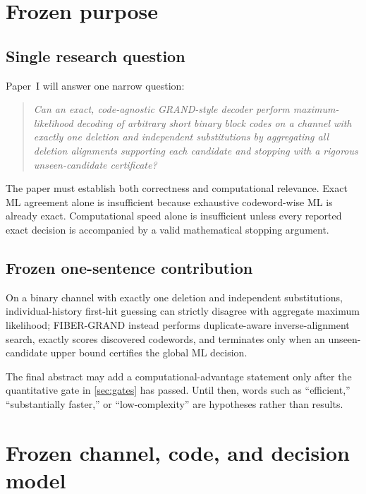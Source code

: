 \documentclass[11pt]{article}
\theoremstyle{definition}
\theoremstyle{remark}
\begin{document}
\tableofcontents
\clearpage

\section{Frozen purpose}
\label{sec:purpose}

\subsection{Single research question}

Paper~I will answer one narrow question:

\begin{quote}
\emph{Can an exact, code-agnostic GRAND-style decoder perform maximum-likelihood decoding of arbitrary short binary block codes on a channel with exactly one deletion and independent substitutions by aggregating all deletion alignments supporting each candidate and stopping with a rigorous unseen-candidate certificate?}
\end{quote}

The paper must establish both correctness and computational relevance. Exact ML agreement alone is insufficient because exhaustive codeword-wise ML is already exact. Computational speed alone is insufficient unless every reported exact decision is accompanied by a valid mathematical stopping argument.

\subsection{Frozen one-sentence contribution}
\label{sec:claim}

\begin{freezebox}
On a binary channel with exactly one deletion and independent substitutions, individual-history first-hit guessing can strictly disagree with aggregate maximum likelihood; FIBER-GRAND instead performs duplicate-aware inverse-alignment search, exactly scores discovered codewords, and terminates only when an unseen-candidate upper bound certifies the global ML decision.
\end{freezebox}

The final abstract may add a computational-advantage statement only after the quantitative gate in \cref{sec:gates} has passed. Until then, words such as ``efficient,'' ``substantially faster,'' or ``low-complexity'' are hypotheses rather than results.

\section{Frozen channel, code, and decision model}
\end{document}

